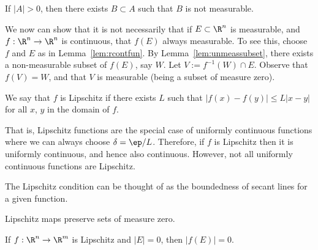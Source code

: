 \pfsk 







\begin{lem} \label{lem:unmeassubset}
If $|A|>0$, then there exists $B \subset A$ such that $B$ is not measurable. 
\end{lem}




We now can show that it is not necessarily that if $E \subset \R^n$ is measurable, and $f: \R^n \to \R^n$ is continuous, that $f(E)$ always measurable. To see this, choose $f$ and $E$ as in Lemma~\ref{lem:rcontfun}. By Lemma~\ref{lem:unmeassubset}, there exists a non-measurable subset of $f(E)$, say $W$. Let $V:= f^{-1}(W) \cap E$. Observe that $f(V)=W$, and that $V$ is measurable (being a subset of measure zero). 

\begin{dfn}[Lipschitz]
We say that $f$ is Lipschitz if there exists $L$ such that $|f(x)-f(y)| \leq L|x-y|$ for all $x$, $y$ in the domain of $f$. 
\end{dfn}

That is, Lipschitz functions are the special case of uniformly continuous functions where we can always choose $\delta=\ep/L$. Therefore, if $f$ is Lipschitz then it is uniformly continuous, and hence also continuous. However, not all uniformly continuous functions are Lipschitz. 


The Lipschitz condition can be thought of as the boundedness of secant lines for a given function. 

Lipschitz maps preserve sets of measure zero.

\begin{thm} \label{thm:lipmeaszero}
If $f: \R^n \to \R^m$ is Lipschitz and $|E|=0$, then $|f(E)|=0$. 
\end{thm}

